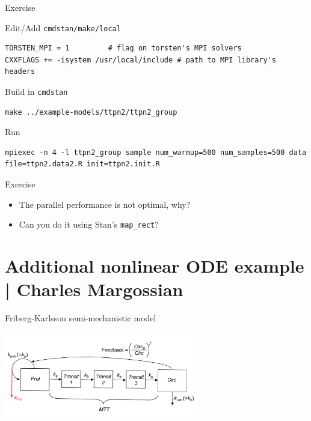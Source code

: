 \documentclass[presentation, allowframebreaks]{beamer}
\begin{document}
\begin{frame}[fragile,label={sec:orgd9ef74d}]{Exercise}
 \begin{block}{Edit/Add \texttt{cmdstan/make/local}}
\begin{verbatim}
TORSTEN_MPI = 1         # flag on torsten's MPI solvers
CXXFLAGS += -isystem /usr/local/include # path to MPI library's headers
\end{verbatim}
\end{block}
\begin{block}{Build in \texttt{cmdstan}}
\begin{verbatim}
make ../example-models/ttpn2/ttpn2_group
\end{verbatim}
\end{block}
\begin{block}{Run}
\begin{verbatim}
mpiexec -n 4 -l ttpn2_group sample num_warmup=500 num_samples=500 data file=ttpn2.data2.R init=ttpn2.init.R
\end{verbatim}
\end{block}
\end{frame}

\begin{frame}[fragile,label={sec:orgec9123a}]{Exercise}
 \begin{itemize}
\item The parallel performance is not optimal, why?
\item Can you do it using Stan's \texttt{map\_rect}?
\end{itemize}
\end{frame}

\section{Additional nonlinear ODE example | \footnotesize{Charles Margossian}}
\label{sec:org3d61b43}
\begin{frame}[label={sec:org2797bb9}]{Friberg-Karlsson semi-mechanistic model \cite{Friberg:2002}}
\begin{center}
  \includegraphics[width=8.5cm]{Friberg-Karlsson_drug}
\end{center}
\end{frame}
\end{document}
